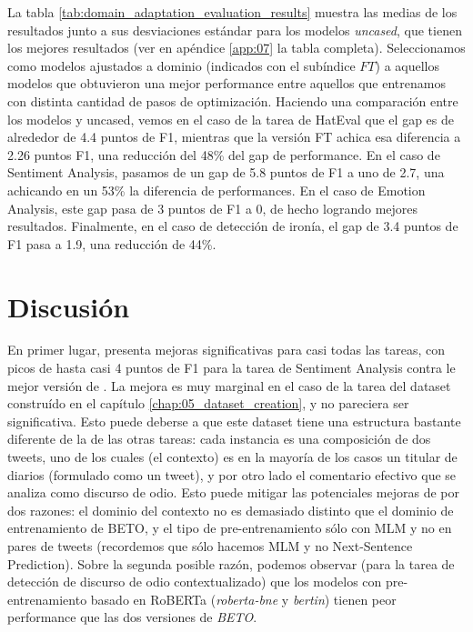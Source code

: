 La tabla \ref{tab:domain_adaptation_evaluation_results} muestra las medias de los resultados junto a sus desviaciones estándar para los modelos \emph{uncased}, que tienen los mejores resultados (ver en apéndice \ref{app:07} la tabla completa). Seleccionamos como modelos ajustados a dominio (indicados con el subíndice $FT$) a aquellos modelos que obtuvieron una mejor performance entre aquellos que entrenamos con distinta cantidad de pasos de optimización. Haciendo una comparación entre los modelos \beto{} y \robertuito{} uncased, vemos en el caso de la tarea de HatEval que el gap es de alrededor de 4.4 puntos de F1, mientras que la versión FT achica esa diferencia a 2.26 puntos F1, una reducción del 48\% del gap de performance. En el caso de Sentiment Analysis, pasamos de un gap de 5.8 puntos de F1 a uno de 2.7, una achicando en un 53\% la diferencia de performances. En el caso de Emotion Analysis, este gap pasa de 3 puntos de F1 a 0, de hecho logrando mejores resultados. Finalmente, en el caso de detección de ironía, el gap de 3.4 puntos de F1 pasa a 1.9, una reducción de 44\%.




\section{Discusión}

En primer lugar, \robertuito{} presenta mejoras significativas para casi todas las tareas, con picos de hasta casi 4 puntos de F1 para la tarea de Sentiment Analysis contra le mejor versión de \beto{}. La mejora es muy marginal en el caso de la tarea del dataset construído en el capítulo \ref{chap:05_dataset_creation}, y no pareciera ser significativa. Esto puede deberse a que este dataset tiene una estructura bastante diferente de la de las otras tareas: cada instancia es una composición de dos tweets, uno de los cuales (el contexto) es en la mayoría de los casos un titular de diarios (formulado como un tweet), y por otro lado el comentario efectivo que se analiza como discurso de odio. Esto puede mitigar las potenciales mejoras de \robertuito{} por dos razones: el dominio del contexto no es demasiado distinto que el dominio de entrenamiento de BETO, y el tipo de pre-entrenamiento sólo con MLM y no en pares de tweets (recordemos que sólo hacemos MLM y no Next-Sentence Prediction). Sobre la segunda posible razón, podemos observar (para la tarea de detección de discurso de odio contextualizado) que los modelos con pre-entrenamiento basado en RoBERTa (\emph{roberta-bne} y \emph{bertin}) tienen peor performance que las dos versiones de \emph{BETO}.

